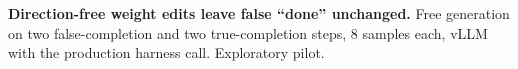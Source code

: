 \begin{table}[t]
\centering\small

\caption{\textbf{Direction-free weight edits leave false ``done'' unchanged.} Free generation on two false-completion and two true-completion steps, 8 samples each, vLLM with the production harness call. Exploratory pilot.}
\label{tab:expo}
\end{table}
